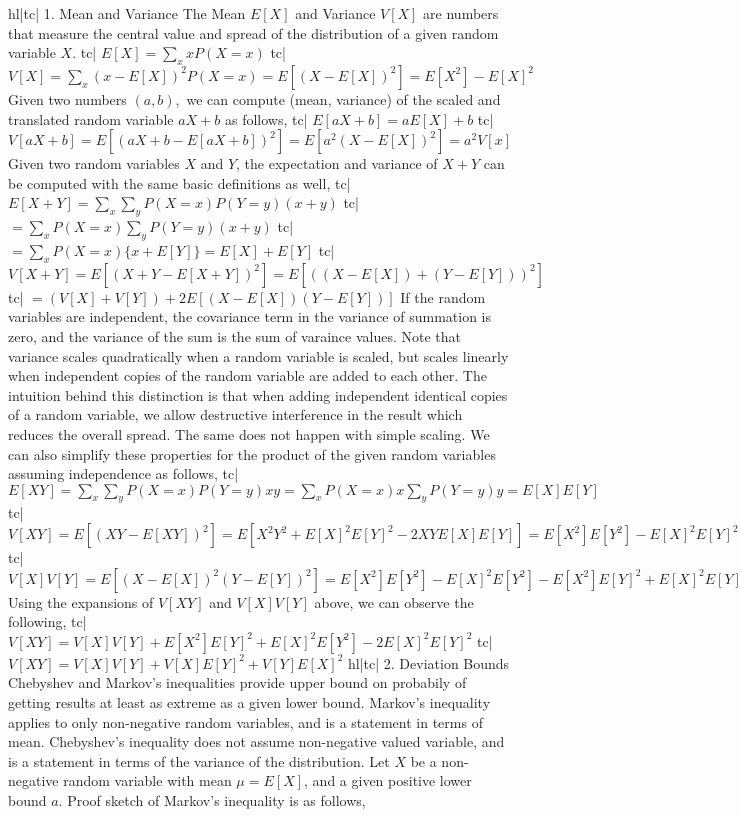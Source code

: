 hl|tc| 1. Mean and Variance
The Mean \(E[X]\) and Variance \(V[X]\) are numbers that measure the central value and spread of the distribution of a given random variable \(X\).
tc| \(E[X]=\sum_x xP(X=x)\)
tc| \(V[X] = \sum_x (x - E[X])^2 P(X=x) = E[(X-E[X])^2] = E[X^2] - E[X]^2 \)
Given two numbers \((a, b),\) we can compute (mean, variance) of the scaled and translated random variable \(aX+b\) as follows,
tc| \(E[aX+b] = aE[X]+b\)
tc| \(V[aX+b] = E[(aX+b-E[aX+b])^2] = E[a^2(X-E[X])^2] = a^2V[x]\)
Given two random variables \(X\) and \(Y\), the expectation and variance of \(X+Y\) can be computed with the same basic definitions as well,
tc| \( E[X+Y] = \sum_x \sum_y P(X=x) P(Y=y) (x+y)\)
tc| \( = \sum_x P(X=x) \sum_y P(Y=y) (x+y) \)
tc| \( = \sum_x P(X=x) \{x + E[Y]\} = E[X] + E[Y] \)
tc| \( V[X+Y] = E[(X+Y - E[X+Y])^2] = E[((X-E[X])+(Y-E[Y]))^2] \)
tc| \(= (V[X] + V[Y]) + 2E[(X-E[X])(Y-E[Y])] \)
If the random variables are independent, the covariance term in the variance of summation is zero, and the variance of the sum is the sum of varaince values. Note that variance scales quadratically when a random variable is scaled, but scales linearly when independent copies of the random variable are added to each other. The intuition behind this distinction is that when adding independent identical copies of a random variable, we allow destructive interference in the result which reduces the overall spread. The same does not happen with simple scaling.
We can also simplify these properties for the product of the given random variables assuming independence as follows,
tc| \( E[XY] = \sum_x \sum_y P(X=x)P(Y=y) xy = \sum_x P(X=x)x \sum_y P(Y=y)y = E[X]E[Y] \)
tc| \( V[XY] = E\left[ (XY-E[XY])^2 \right] = E\left[X^2Y^2 + E[X]^2 E[Y]^2 - 2XYE[X]E[Y] \right] = E[X^2]E[Y^2] - E[X]^2E[Y]^2 \)
tc| \( V[X]V[Y] = E\left[(X-E[X])^2(Y-E[Y])^2 \right] = E[X^2]E[Y^2] - E[X]^2E[Y^2] - E[X^2]E[Y]^2 + E[X]^2E[Y]^2 \)
Using the expansions of \(V[XY]\) and \(V[X]V[Y]\) above, we can observe the following,
tc| \( V[XY] = V[X]V[Y] + E[X^2]E[Y]^2 + E[X]^2E[Y^2] - 2E[X]^2E[Y]^2 \)
tc| \( V[XY] = V[X]V[Y] + V[X]E[Y]^2 + V[Y]E[X]^2 \)
hl|tc| 2. Deviation Bounds
Chebyshev and Markov's inequalities provide upper bound on probabily of getting results at least as extreme as a given lower bound. Markov's inequality applies to only non-negative random variables, and is a statement in terms of mean. Chebyshev's inequality does not assume non-negative valued variable, and is a statement in terms of the variance of the distribution.
Let \(X\) be a non-negative random variable with mean \(\mu=E[X]\), and a given positive lower bound \(a\). Proof sketch of Markov's inequality is as follows,
